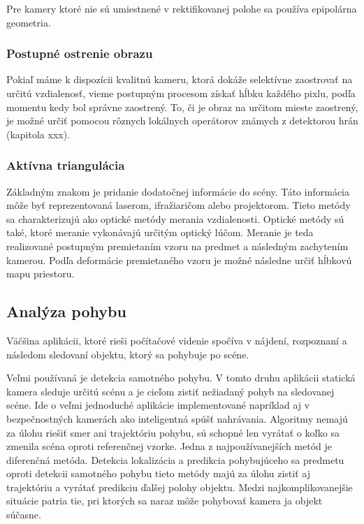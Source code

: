Pre kamery ktoré nie sú umiestnené v rektifikovanej  polohe sa používa epipolárna geometria. 


\subsubsection{Postupné ostrenie obrazu }
Pokiaľ máme k dispozícii kvalitnú kameru, ktorá dokáže selektívne zaostrovať na určitú vzdialenosť, vieme postupným procesom získať hĺbku každého pixlu, podľa momentu kedy bol správne zaostrený. To, či je obraz na určitom mieste zaostrený, je možné určiť pomocou rôznych lokálnych operátorov známych z detektorou hrán (kapitola xxx). 


\subsubsection{Aktívna triangulácia }
Základným znakom je pridanie dodatočnej informácie do scény. Táto informácia môže byť reprezentovaná laserom, ifražiaričom alebo projektorom. Tieto metódy sa charakterizujú ako optické metódy merania vzdialenosti. Optické metódy sú také, ktoré meranie vykonávajú určitým optický lúčom.  Meranie je teda realizované postupným premietaním vzoru na predmet a následným zachytením kamerou. Podľa deformácie premietaného vzoru je možné následne určiť hĺbkovú mapu priestoru.

\subsection{Analýza pohybu }
Väčšina aplikácii, ktoré rieši počítačové videnie spočíva v nájdení, rozpoznaní a následom sledovaní objektu, ktorý sa pohybuje po scéne. 

Veľmi používaná je detekcia samotného pohybu. V tomto druhu aplikácii statická kamera sleduje určitú scénu a je cieľom zistiť nežiadaný pohyb na sledovanej scéne. Ide o veľmi jednoduché aplikácie implementované napríklad aj v bezpečnostných kamerách ako inteligentná spúšť nahrávania.  Algoritmy nemajú za úlohu riešiť smer ani trajektóriu pohybu, sú schopné len vyrátať o koľko sa zmenila scéna oproti referenčnej vzorke. Jedna z najpoužívanejších metód je diferenčná metóda. Detekcia lokalizácia a predikcia pohybujúceho sa predmetu oproti detekcii samotného pohybu tieto metódy majú  za úlohu zistiť aj trajektóriu a vyrátať predikciu ďalšej polohy objektu. Medzi najkomplikovanejšie situácie patria tie, pri ktorých sa naraz môže pohybovať kamera ja objekt súčasne.

